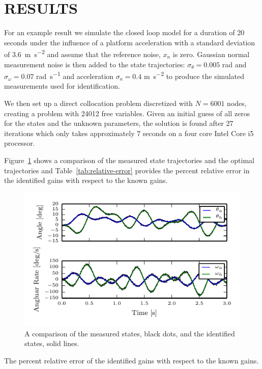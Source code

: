 \documentclass[11pt,a4paper,twocolumn]{article}
\begin{document}
\section*{RESULTS}

For an example result we simulate the closed loop model for a duration of 20
seconds under the influence of a platform acceleration with a standard
deviation of 3.6~\si{\meter\per\second\squared} and assume that the reference
noise, $x_n$ is zero. Gaussian normal measurement noise is then added to the
state trajectories: $\sigma_\theta=0.005$ \si{\radian} and $\sigma_\omega=0.07$
\si{\radian\per\second} and acceleration $\sigma_a=0.4$
\si{\meter\per\second\squared} to produce the simulated measurements used for
identification.

We then set up a direct collocation problem discretized with $N=6001$ nodes,
creating a problem with 24012 free variables. Given an initial guess of all
zeros for the states and the unknown parameters, the solution is found after 27
iterations which only takes approximately 7 seconds on a four core Intel Core
i5 processor.

Figure~\ref{fig:trajectory-comparison} shows a comparison of the measured state
trajectories and the optimal trajectories and Table~\ref{tab:relative-error}
provides the percent relative error in the identified gains with respect to the
known gains.
%
\begin{figure}
  \centering
  \includegraphics[width=\columnwidth]{figures/trajectory-comparison.pdf}
  \caption{A comparison of the measured states, black dots, and the identified
    states, solid lines.}
  \label{fig:trajectory-comparison}
\end{figure}
%
\begin{table}
  \centering
  \caption{The percent relative error of the identified gains with respect to
    the known gains.}
  
  \label{tab:relative-error}
\end{table}
\end{document}
